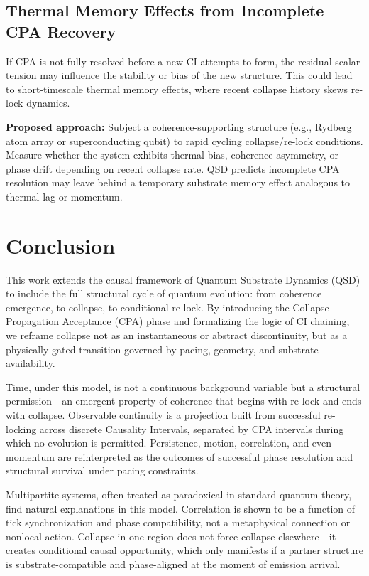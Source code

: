\documentclass[preprints,article,submit,pdftex,moreauthors]{Definitions/mdpi}
\begin{document}
\subsection{Thermal Memory Effects from Incomplete CPA Recovery}

If CPA is not fully resolved before a new CI attempts to form, the residual scalar tension may influence the stability or bias of the new structure. This could lead to short-timescale thermal memory effects, where recent collapse history skews re-lock dynamics.

\textbf{Proposed approach:}  
Subject a coherence-supporting structure (e.g., Rydberg atom array or superconducting qubit) to rapid cycling collapse/re-lock conditions. Measure whether the system exhibits thermal bias, coherence asymmetry, or phase drift depending on recent collapse rate. QSD predicts incomplete CPA resolution may leave behind a temporary substrate memory effect analogous to thermal lag or momentum.



\section{Conclusion}

This work extends the causal framework of Quantum Substrate Dynamics (QSD) to include the full structural cycle of quantum evolution: from coherence emergence, to collapse, to conditional re-lock. By introducing the Collapse Propagation Acceptance (CPA) phase and formalizing the logic of CI chaining, we reframe collapse not as an instantaneous or abstract discontinuity, but as a physically gated transition governed by pacing, geometry, and substrate availability.

Time, under this model, is not a continuous background variable but a structural permission—an emergent property of coherence that begins with re-lock and ends with collapse. Observable continuity is a projection built from successful re-locking across discrete Causality Intervals, separated by CPA intervals during which no evolution is permitted. Persistence, motion, correlation, and even momentum are reinterpreted as the outcomes of successful phase resolution and structural survival under pacing constraints.

Multipartite systems, often treated as paradoxical in standard quantum theory, find natural explanations in this model. Correlation is shown to be a function of tick synchronization and phase compatibility, not a metaphysical connection or nonlocal action. Collapse in one region does not force collapse elsewhere—it creates conditional causal opportunity, which only manifests if a partner structure is substrate-compatible and phase-aligned at the moment of emission arrival.
\end{document}
